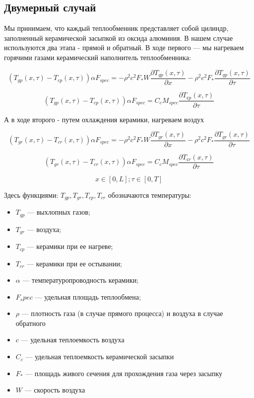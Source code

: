 \documentclass[a4paper,12pt]{article}
\begin{document}
  \subsection{Двумерный случай}

  Мы принимаем, что каждый теплообменник представляет собой цилиндр,
  заполненный керамической засыпкой из оксида алюминия. В нашем случае
  используются два этапа - прямой и обратный. В ходе первого — мы
  нагреваем горячими газами керамический наполнитель теплообменника:

  $$(T_{gp}(x,\tau) - T_{cp}(x,\tau)) \alpha F_{spec} = - \rho^2 c^2 F_* W\frac{\partial T_{gp}(x,\tau)}{\partial x} - \rho^2 c^2 F_*\frac{\partial T_{gp}(x,\tau)}{\partial \tau}$$

  $$(T_{gp}(x,\tau) - T_{cp}(x,\tau))\alpha F_{spec}=  C_c M_{spec} \frac{\partial T_{сp}(x,\tau)}{\partial \tau}$$

  А в ходе второго - путем охлаждения керамики, нагреваем воздух

  $$(T_{gr}(x,\tau) - T_{cr}(x,\tau)) \alpha F_{spec} = - \rho^2 c^2 F_* W\frac{\partial T_{gr}(x,\tau)}{\partial x} - \rho^2 c^2 F_*\frac{\partial T_{gr}(x,\tau)}{\partial \tau}$$

  $$(T_{gr}(x,\tau) - T_{cr}(x,\tau))\alpha F_{spec}=  C_c M_{spec} \frac{\partial T_{сr}(x,\tau)}{\partial \tau}$$

  $$x \in [0, L]; \tau \in [0, T]$$

  Здесь функциями: $T_{gp}, T_{gr}, T_{cp}, T_{cr}$ обозначаются температуры:
\begin{itemize}
\item $T_{gp}$ — выхлопных газов;
\item $T_{gr}$ — воздуха;
\item $T_{cp}$ — керамики при ее нагреве;
\item $T_{cr}$ — керамики при ее остывании;
\item $\alpha$ — температуропроводность керамики;
\item $F_spec$ — удельная площадь теплообмена;
\item $\rho$ —  плотность газа (в случае прямого процесса) и воздуха в случае обратного
\item $c$ — удельная теплоемкость воздуха
\item  $C_c$  — удельная теплоемкость керамической засыпки
\item $F_*$ — площадь живого сечения для прохождения газа через засыпку
\item $W$ — скорость воздуха
\end{itemize}
\end{document}
